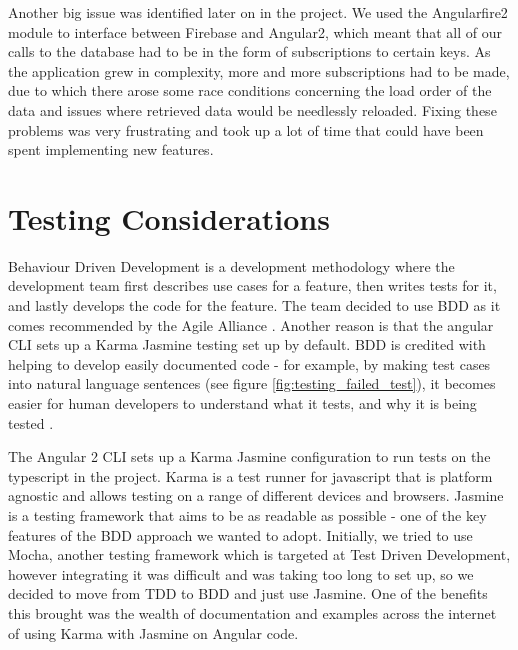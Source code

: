 \documentclass{l3proj}
\begin{document}
Another big issue was identified later on in the project. We used the
 Angularfire2 module to interface between Firebase and Angular2, which meant
 that all of our calls to the database had to be in the form of subscriptions
 to certain keys. As the application grew in complexity, more and more
 subscriptions had to be made, due to which there arose some race conditions
 concerning the load order of the data and issues where retrieved data would
 be needlessly reloaded. Fixing these problems was very frustrating and took
 up a lot of time that could have been spent implementing new features.

\section{Testing Considerations} %
\label{sec:testing}

Behaviour Driven Development is a development methodology where the development team
 first describes use cases for a feature, then writes tests for it, and lastly
 develops the code for the feature. The team decided to use BDD as it comes
 recommended by the Agile Alliance \cite{agilealliance_bdd}. Another reason
 is that the angular CLI sets up a Karma Jasmine testing set up by default.
 BDD is credited with helping to develop easily documented code - for example,
 by making test cases into natural language sentences (see figure
 \ref{fig:testing_failed_test}), it becomes easier for human developers to
 understand what it tests, and why it is being tested \cite{north2006bdd}.

 

The Angular 2 CLI sets up a Karma Jasmine configuration to run tests on
 the typescript in the project. Karma is a test runner for javascript
 that is platform agnostic and allows testing on a range of different devices
 and browsers\cite{jina2013javascript}. Jasmine is a testing framework
 that aims to be as readable as possible - one of the key features of
 the BDD approach we wanted to adopt. Initially, we tried to use Mocha,
 another testing framework which is targeted at Test Driven Development,
 however integrating it was difficult and was taking too long to set up,
 so we decided to move from TDD to BDD and just use Jasmine. One of the
 benefits this brought was the wealth of documentation and examples
 across the internet of using Karma with Jasmine on Angular code.
\end{document}
